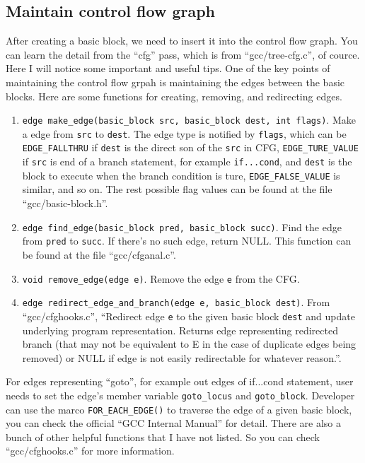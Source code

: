 \documentclass[11pt]{article}
\begin{document}
\subsection{Maintain control flow graph}
After creating a basic block, we need to insert it into the control flow graph. You can learn the detail from the ``cfg'' pass, which is from ``gcc/tree-cfg.c'', of cource. Here I will notice some important and useful tips. One of the key points of maintaining the control flow grpah is maintaining the edges between the basic blocks. Here are some functions for creating, removing, and redirecting edges.
\begin{enumerate}
\item \texttt{edge make\_edge(basic\_block src, basic\_block dest, int flags)}. Make a edge from \texttt{src} to \texttt{dest}. The edge type is notified by \texttt{flags}, which can be \texttt{EDGE\_FALLTHRU} if \texttt{dest} is the direct son of the \texttt{src} in CFG, \texttt{EDGE\_TURE\_VALUE} if \texttt{src} is end of a branch statement, for example \texttt{if...cond}, and \texttt{dest} is the block to execute when the branch condition is ture, \texttt{EDGE\_FALSE\_VALUE} is similar, and so on. The rest possible flag values can be found at the file ``gcc/basic-block.h''. 
\item \texttt{edge find\_edge(basic\_block pred, basic\_block succ)}. Find the edge from \texttt{pred} to \texttt{succ}. If there's no such edge, return NULL. This function can be found at the file ``gcc/cfganal.c''.
\item \texttt{void remove\_edge(edge e)}. Remove the edge \texttt{e} from the CFG.
\item \texttt{edge redirect\_edge\_and\_branch(edge e, basic\_block dest)}. From ``gcc/cfghooks.c'', ``Redirect edge \texttt{e} to the given basic block \texttt{dest} and update underlying program representation.  Returns edge representing redirected branch (that may not be equivalent to E in the case of duplicate edges being removed) or NULL if edge is not easily redirectable for whatever reason.''.
\end{enumerate}
For edges representing ``goto'', for example out edges of if...cond statement, user needs to set the edge's member variable \texttt{goto\_locus} and \texttt{goto\_block}.
Developer can use the marco \texttt{FOR\_EACH\_EDGE()} to traverse the edge of a given basic block, you can check the official ``GCC Internal Manual'' for detail.
There are also a bunch of other helpful functions that I have not listed. So you can check ``gcc/cfghooks.c'' for more information.
\end{document}

